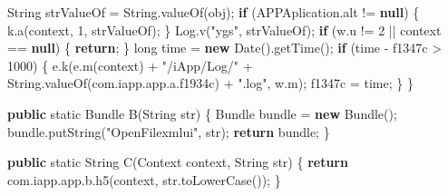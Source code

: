 \documentclass[
]{article}
\newenvironment{Shaded}{}{}
\newcommand{\BuiltInTok}[1]{\textcolor[rgb]{0.00,0.50,0.00}{#1}}
\newcommand{\ControlFlowTok}[1]{\textcolor[rgb]{0.00,0.44,0.13}{\textbf{#1}}}
\newcommand{\DataTypeTok}[1]{\textcolor[rgb]{0.56,0.13,0.00}{#1}}
\newcommand{\DecValTok}[1]{\textcolor[rgb]{0.25,0.63,0.44}{#1}}
\newcommand{\FunctionTok}[1]{\textcolor[rgb]{0.02,0.16,0.49}{#1}}
\newcommand{\KeywordTok}[1]{\textcolor[rgb]{0.00,0.44,0.13}{\textbf{#1}}}
\newcommand{\NormalTok}[1]{#1}
\newcommand{\OperatorTok}[1]{\textcolor[rgb]{0.40,0.40,0.40}{#1}}
\newcommand{\StringTok}[1]{\textcolor[rgb]{0.25,0.44,0.63}{#1}}
\begin{document}
\begin{Shaded}
\begin{Highlighting}[]
        \BuiltInTok{String}\NormalTok{ strValueOf }\OperatorTok{=} \BuiltInTok{String}\OperatorTok{.}\FunctionTok{valueOf}\OperatorTok{(}\NormalTok{obj}\OperatorTok{);}
        \ControlFlowTok{if} \OperatorTok{(}\NormalTok{APPAplication}\OperatorTok{.}\FunctionTok{alt} \OperatorTok{!=} \KeywordTok{null}\OperatorTok{)} \OperatorTok{\{}
\NormalTok{            k}\OperatorTok{.}\FunctionTok{a}\OperatorTok{(}\NormalTok{context}\OperatorTok{,} \DecValTok{1}\OperatorTok{,}\NormalTok{ strValueOf}\OperatorTok{);}
        \OperatorTok{\}}
\NormalTok{        Log}\OperatorTok{.}\FunctionTok{v}\OperatorTok{(}\StringTok{"ygs"}\OperatorTok{,}\NormalTok{ strValueOf}\OperatorTok{);}
        \ControlFlowTok{if} \OperatorTok{(}\NormalTok{w}\OperatorTok{.}\FunctionTok{u} \OperatorTok{!=} \DecValTok{2} \OperatorTok{||}\NormalTok{ context }\OperatorTok{==} \KeywordTok{null}\OperatorTok{)} \OperatorTok{\{}
            \ControlFlowTok{return}\OperatorTok{;}
        \OperatorTok{\}}
        \DataTypeTok{long}\NormalTok{ time }\OperatorTok{=} \KeywordTok{new} \BuiltInTok{Date}\OperatorTok{().}\FunctionTok{getTime}\OperatorTok{();}
        \ControlFlowTok{if} \OperatorTok{(}\NormalTok{time }\OperatorTok{{-}}\NormalTok{ f1347c }\OperatorTok{\textgreater{}} \DecValTok{1000}\OperatorTok{)} \OperatorTok{\{}
\NormalTok{            e}\OperatorTok{.}\FunctionTok{k}\OperatorTok{(}\NormalTok{e}\OperatorTok{.}\FunctionTok{m}\OperatorTok{(}\NormalTok{context}\OperatorTok{)} \OperatorTok{+} \StringTok{"/iApp/Log/"} \OperatorTok{+} \BuiltInTok{String}\OperatorTok{.}\FunctionTok{valueOf}\OperatorTok{(}\NormalTok{com}\OperatorTok{.}\FunctionTok{iapp}\OperatorTok{.}\FunctionTok{app}\OperatorTok{.}\FunctionTok{a}\OperatorTok{.}\FunctionTok{f1934c}\OperatorTok{)} \OperatorTok{+} \StringTok{".log"}\OperatorTok{,}\NormalTok{ w}\OperatorTok{.}\FunctionTok{m}\OperatorTok{);}
\NormalTok{            f1347c }\OperatorTok{=}\NormalTok{ time}\OperatorTok{;}
        \OperatorTok{\}}
    \OperatorTok{\}}

    \KeywordTok{public} \DataTypeTok{static}\NormalTok{ Bundle }\FunctionTok{B}\OperatorTok{(}\BuiltInTok{String}\NormalTok{ str}\OperatorTok{)} \OperatorTok{\{}
\NormalTok{        Bundle bundle }\OperatorTok{=} \KeywordTok{new} \FunctionTok{Bundle}\OperatorTok{();}
\NormalTok{        bundle}\OperatorTok{.}\FunctionTok{putString}\OperatorTok{(}\StringTok{"OpenFilexmlui"}\OperatorTok{,}\NormalTok{ str}\OperatorTok{);}
        \ControlFlowTok{return}\NormalTok{ bundle}\OperatorTok{;}
    \OperatorTok{\}}

    \KeywordTok{public} \DataTypeTok{static} \BuiltInTok{String} \FunctionTok{C}\OperatorTok{(}\BuiltInTok{Context}\NormalTok{ context}\OperatorTok{,} \BuiltInTok{String}\NormalTok{ str}\OperatorTok{)} \OperatorTok{\{}
        \ControlFlowTok{return}\NormalTok{ com}\OperatorTok{.}\FunctionTok{iapp}\OperatorTok{.}\FunctionTok{app}\OperatorTok{.}\FunctionTok{b}\OperatorTok{.}\FunctionTok{h5}\OperatorTok{(}\NormalTok{context}\OperatorTok{,}\NormalTok{ str}\OperatorTok{.}\FunctionTok{toLowerCase}\OperatorTok{());}
    \OperatorTok{\}}


\end{Highlighting}
\end{Shaded}
\end{document}
